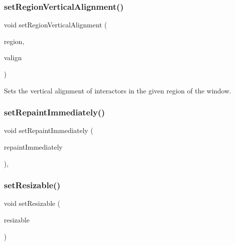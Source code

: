\subsubsection{\texorpdfstring{set\+Region\+Vertical\+Alignment()}{setRegionVerticalAlignment()}\hspace{0.1cm}{\footnotesize\ttfamily [2/2]}}
{\footnotesize\ttfamily void set\+Region\+Vertical\+Alignment (\begin{DoxyParamCaption}\item[{\mbox{\hyperlink{classsgl_1_1GWindow_a81a01a86de31071a92e6cce0bab9bc4b}{Region}}}]{region,  }\item[{\mbox{\hyperlink{namespacesgl_a9c2ed22cfbd21f13df24ea193b310aee}{Vertical\+Alignment}}}]{valign }\end{DoxyParamCaption})\hspace{0.3cm}{\ttfamily [virtual]}}



Sets the vertical alignment of interactors in the given region of the window. 

\mbox{\label{classsgl_1_1GForwardDrawingSurface_a4fd51814e65e6813b07650491c78d6a1}} 
\subsubsection{\texorpdfstring{set\+Repaint\+Immediately()}{setRepaintImmediately()}}
{\footnotesize\ttfamily void set\+Repaint\+Immediately (\begin{DoxyParamCaption}\item[{bool}]{repaint\+Immediately }\end{DoxyParamCaption})\hspace{0.3cm}{\ttfamily [override]}, {\ttfamily [inherited]}}

\mbox{\label{classsgl_1_1GWindow_a8bf0c7d9f9aea44fa74f63a358df7d22}} 
\subsubsection{\texorpdfstring{set\+Resizable()}{setResizable()}}
{\footnotesize\ttfamily void set\+Resizable (\begin{DoxyParamCaption}\item[{bool}]{resizable }\end{DoxyParamCaption})\hspace{0.3cm}{\ttfamily [virtual]}}



